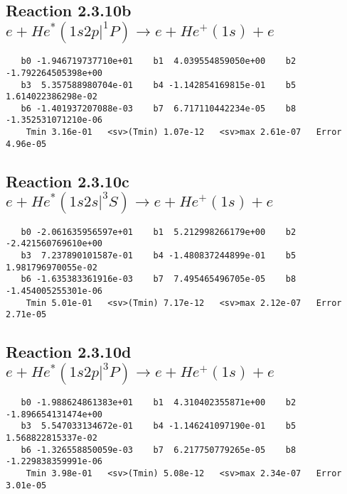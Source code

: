 \documentclass[12pt]{article}
\begin{document}
\newpage
\subsection{
Reaction 2.3.10b $  e + He^*(1s2p|^1P) \rightarrow e + He^+(1s) + e$}


\begin{small}\begin{verbatim}
   b0 -1.946719737710e+01    b1  4.039554859050e+00    b2 -1.792264505398e+00
   b3  5.357588980704e-01    b4 -1.142854169815e-01    b5  1.614022386298e-02
   b6 -1.401937207088e-03    b7  6.717110442234e-05    b8 -1.352531071210e-06
    Tmin 3.16e-01   <sv>(Tmin) 1.07e-12   <sv>max 2.61e-07   Error 4.96e-05
\end{verbatim}\end{small}

\newpage
\subsection{
Reaction 2.3.10c $  e + He^*(1s2s|^3S) \rightarrow e + He^+(1s) + e$}


\begin{small}\begin{verbatim}
   b0 -2.061635956597e+01    b1  5.212998266179e+00    b2 -2.421560769610e+00
   b3  7.237890101587e-01    b4 -1.480837244899e-01    b5  1.981796970055e-02
   b6 -1.635383361916e-03    b7  7.495465496705e-05    b8 -1.454005255301e-06
    Tmin 5.01e-01   <sv>(Tmin) 7.17e-12   <sv>max 2.12e-07   Error 2.71e-05
\end{verbatim}\end{small}

\newpage
\subsection{
Reaction 2.3.10d $ e + He^*(1s2p|^3P) \rightarrow e + He^+(1s) + e$}


\begin{small}\begin{verbatim}
   b0 -1.988624861383e+01    b1  4.310402355871e+00    b2 -1.896654131474e+00
   b3  5.547033134672e-01    b4 -1.146241097190e-01    b5  1.568822815337e-02
   b6 -1.326558850059e-03    b7  6.217750779265e-05    b8 -1.229838359991e-06
    Tmin 3.98e-01   <sv>(Tmin) 5.08e-12   <sv>max 2.34e-07   Error 3.01e-05
\end{verbatim}\end{small}
\end{document}
